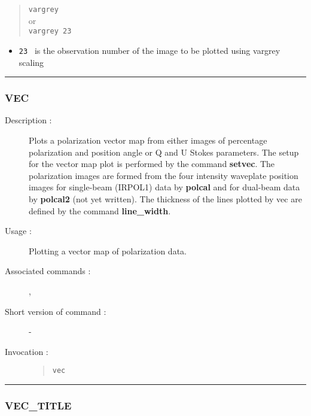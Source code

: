 \begin{description}
\begin{quote}{\tt  vargrey }\\
or \\
{\tt vargrey 23 }
\end{quote}

\begin{itemize}

\item {\tt 23 } is the observation number of the image to be plotted
 using vargrey scaling
\end{itemize}

\end{description}

\hrule 
\subsubsection*{\label{VEC}VEC}

\begin{description}

\item[Description :] Plots a polarization vector map from either images
of percentage polarization and position angle or Q and U Stokes
parameters.  The setup for the vector map plot is performed by the
command {\bf setvec}.  The polarization images are formed from the four
intensity waveplate position images for single-beam (IRPOL1) data by
{\bf polcal} and for dual-beam data by {\bf polcal2} (not yet
written).  The thickness of the lines plotted by vec are defined by the
command {\bf line\_width}.

\item[Usage :] Plotting a vector map of polarization data.
\item[Associated commands :] {\tt {}}, 
{\tt {}}
\item[Short version of command :] -
\item[Invocation :]

\begin{quote}{\tt  vec }\end{quote}

\end{description}

\hrule 
\subsubsection*{\label{VEC_TITLE}VEC\_TITLE}

